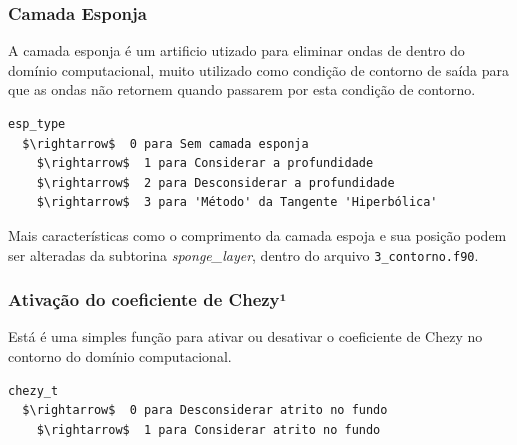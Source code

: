 \documentclass[12pt, a4paper]{article}
\begin{document}
\subsubsection{Camada Esponja}

A camada esponja é um artificio utizado para eliminar ondas de dentro do domínio computacional, muito utilizado como condição de contorno de saída para que as ondas não retornem quando passarem por esta condição de contorno.

\begin{lstlisting}[escapeinside='']
esp_type
  $\rightarrow$  0 para Sem camada esponja
	$\rightarrow$  1 para Considerar a profundidade
	$\rightarrow$  2 para Desconsiderar a profundidade
	$\rightarrow$  3 para 'Método' da Tangente 'Hiperbólica'
\end{lstlisting}	

Mais características como o comprimento da camada espoja e sua posição podem ser alteradas da subtorina \textit{sponge\_layer}, dentro do arquivo \verb|3_contorno.f90|.


\subsubsection{Ativação do coeficiente de Chezy¹}
Está é uma simples função para ativar ou desativar o coeficiente de Chezy no contorno do domínio computacional.
	
\begin{lstlisting}[escapeinside='']
chezy_t	
  $\rightarrow$  0 para Desconsiderar atrito no fundo
	$\rightarrow$  1 para Considerar atrito no fundo
\end{lstlisting}


\end{document}
